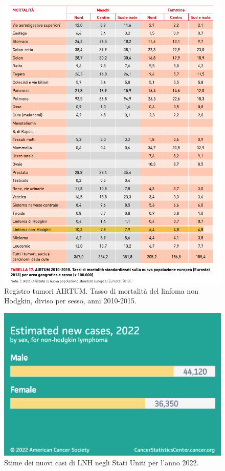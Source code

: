 \begin{figure}[H]
    \begin{center}
    \includegraphics[width=0.8\columnwidth]{img/MORTALITA.png}
    \vspace{-3mm}
    \end{center}
    \caption{Registro tumori AIRTUM. Tasso di mortalità del linfoma non Hodgkin, diviso per sesso, anni 2010-2015.
    \cite{img4-6-7}}

\end{figure}

\begin{figure}[H]
    \begin{center}
    \includegraphics[width=0.5\columnwidth]{img/Estimatednewcases2022.png}
    \vspace{-3mm}
    \end{center}
    \caption{Stime dei nuovi casi di LNH negli Stati Uniti per l’anno 2022.
    \cite{Americanstatistic}}
    \label{fig:FIGURE_2.6}
\end{figure}


